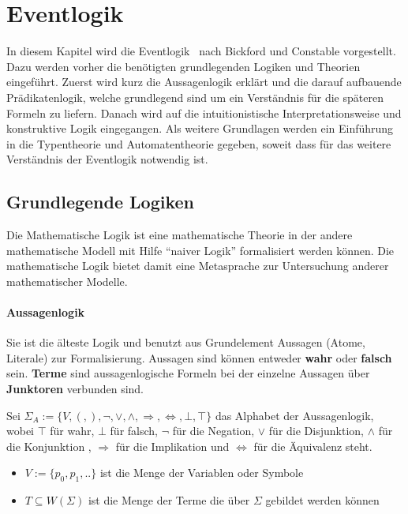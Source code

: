 \section{Eventlogik}
\label{sec_logik}




In diesem Kapitel wird die Eventlogik~\cite{bickford2003logic} nach Bickford und
Constable vorgestellt. Dazu werden vorher die benötigten grundlegenden Logiken
und Theorien eingeführt. Zuerst wird kurz die Aussagenlogik erklärt und die
darauf aufbauende Prädikatenlogik, welche grundlegend sind um ein Verständnis
für die späteren Formeln zu liefern. Danach wird auf die intuitionistische
Interpretationsweise und konstruktive Logik eingegangen. Als weitere Grundlagen
werden ein Einführung in die Typentheorie und Automatentheorie gegeben, soweit
dass für das weitere Verständnis der Eventlogik notwendig ist.

\subsection{Grundlegende Logiken}
Die Mathematische Logik ist eine mathematische Theorie in der andere
mathematische Modell mit Hilfe "`naiver Logik"' formalisiert werden können.
Die mathematische Logik bietet damit eine Metasprache zur Untersuchung anderer
mathematischer Modelle.~\cite{heinemann2013logik}

\paragraph{Aussagenlogik}
Sie ist die älteste Logik und benutzt aus Grundelement Aussagen (Atome,
Literale) zur Formalisierung. Aussagen sind können entweder \textbf{wahr}
oder \textbf{falsch} sein. \textbf{Terme} sind aussagenlogische Formeln
bei der einzelne Aussagen über \textbf{Junktoren} verbunden sind.~\cite{heinemann2013logik}

\begin{defi}
  Sei $\Sigma_A := \{V,(,),\neg,\vee,\wedge,\Rightarrow,\Leftrightarrow,\bot,\top\}$ das Alphabet der Aussagenlogik, wobei $\top$ für
wahr, $\bot$ für falsch, $\neg$ für die Negation, $\vee$ für die Disjunktion, $\wedge$ für die
Konjunktion , $\Rightarrow$ für die Implikation und $\Leftrightarrow$ für die Äquivalenz steht.
\begin{itemize}
\item $V:=\{p_0,p_1,..\}$  ist die Menge der Variablen oder Symbole
\item $T\subseteq W(\Sigma)$  ist die Menge der Terme die über $\Sigma$ gebildet werden können 
\end{itemize}
\end{defi}

